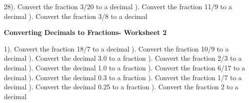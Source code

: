 \documentclass{article}%
\begin{document}
28). Convert the fraction 3/20 to a decimal%
\newline%
\newline%
). Convert the fraction 11/9 to a decimal%
\newline%
\newline%
). Convert the fraction 3/8 to a decimal%
\newline%
\newline%
\newline%
\pagebreak%
\large%
\begin{center}%
\textbf{Converting Decimals to Fractions- Worksheet 2}%
\newline%
\end{center} \normalsize%
1). Convert the fraction 18/7 to a decimal%
\newline%
\newline%
). Convert the fraction 10/9 to a decimal%
\newline%
\newline%
). Convert the decimal 3.0 to a fraction%
\newline%
\newline%
). Convert the fraction 2/3 to a decimal%
\newline%
\newline%
). Convert the decimal 1.0 to a fraction%
\newline%
\newline%
). Convert the fraction 6/17 to a decimal%
\newline%
\newline%
). Convert the decimal 0.3 to a fraction%
\newline%
\newline%
). Convert the fraction 1/7 to a decimal%
\newline%
\newline%
). Convert the decimal 0.25 to a fraction%
\newline%
\newline%
). Convert the fraction 2 to a decimal%
\end{document}
